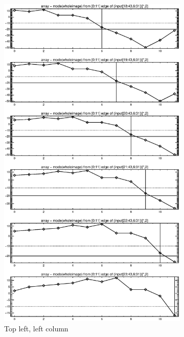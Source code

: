 \documentclass[10pt]{article}
\begin{document}
\begin{figure}[!h]
    \centering 
    \hspace{-1.0in}
    \begin{subfigure}[b]{.4\linewidth}
        \centering
        \includegraphics[width=1.4\textwidth]{../plots_tables_images/topleft0.eps} 
        \caption{Top left, left column}
    \end{subfigure}
    \hspace{1.0in}
    \begin{subfigure}[b]{.4\linewidth}

\end{subfigure}
\end{figure}
\end{document}
